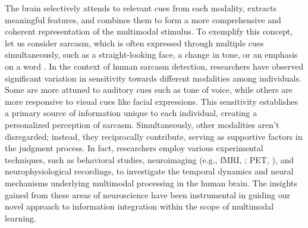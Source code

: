 \documentclass{article} %
\begin{document}
The brain selectively attends to relevant cues from each modality, extracts meaningful features, and combines them to form a more comprehensive and coherent representation of the multimodal stimulus. 
To exemplify this concept, let us consider sarcasm, which is often expressed through multiple cues simultaneously, such as a straight-looking face, a change in tone, or an emphasis on a word \citep{castro2019towards}. In the context of human sarcasm detection, researchers have observed significant variation in sensitivity towards different modalities among individuals. Some are more attuned to auditory cues such as tone of voice, while others are more responsive to visual cues like facial expressions. This sensitivity establishes a primary source of information unique to each individual, creating a personalized perception of sarcasm. Simultaneously, other modalities aren't disregarded; instead, they reciprocally contribute, serving as supportive factors in the judgment process. In fact, researchers employ various experimental techniques, such as behavioral studies, neuroimaging (e.g., fMRI, \citealp{glover2011overview}; PET, \citealp{PRICE2012816}), and neurophysiological recordings, to investigate the temporal dynamics and neural mechanisms underlying multimodal processing in the human brain. The insights gained from these areas of neuroscience have been instrumental in guiding our novel approach to information integration within the scope of multimodal learning.
\end{document}
